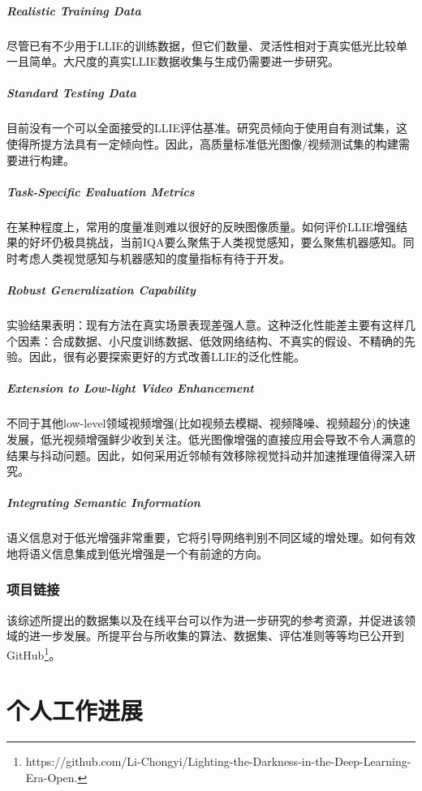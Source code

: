 \documentclass[letterpaper,12pt]{article}
\begin{document}
		\subparagraph{Realistic Training Data} \qquad
		
		尽管已有不少用于LLIE的训练数据，但它们数量、灵活性相对于真实低光比较单一且简单。大尺度的真实LLIE数据收集与生成仍需要进一步研究。
		
		\subparagraph{Standard Testing Data} \qquad
		
		目前没有一个可以全面接受的LLIE评估基准。研究员倾向于使用自有测试集，这使得所提方法具有一定倾向性。因此，高质量标准低光图像/视频测试集的构建需要进行构建。
		
		\subparagraph{Task-Specific Evaluation Metrics} \qquad
		
		在某种程度上，常用的度量准则难以很好的反映图像质量。如何评价LLIE增强结果的好坏仍极具挑战，当前IQA要么聚焦于人类视觉感知，要么聚焦机器感知。同时考虑人类视觉感知与机器感知的度量指标有待于开发。
		
		\subparagraph{Robust Generalization Capability} \qquad
		
		实验结果表明：现有方法在真实场景表现差强人意。这种泛化性能差主要有这样几个因素：合成数据、小尺度训练数据、低效网络结构、不真实的假设、不精确的先验。因此，很有必要探索更好的方式改善LLIE的泛化性能。
		
		\subparagraph{Extension to Low-light Video Enhancement} \qquad
		
		不同于其他low-level领域视频增强(比如视频去模糊、视频降噪、视频超分)的快速发展，低光视频增强鲜少收到关注。低光图像增强的直接应用会导致不令人满意的结果与抖动问题。因此，如何采用近邻帧有效移除视觉抖动并加速推理值得深入研究。
		
		\subparagraph{Integrating Semantic Information} \qquad
		
		语义信息对于低光增强非常重要，它将引导网络判别不同区域的增处理。如何有效地将语义信息集成到低光增强是一个有前途的方向。
	
	
	\subsubsection{项目链接}
	
	该综述所提出的数据集以及在线平台可以作为进一步研究的参考资源，并促进该领域的进一步发展。所提平台与所收集的算法、数据集、评估准则等等均已公开到GitHub\footnote{https://github.com/Li-Chongyi/Lighting-the-Darkness-in-the-Deep-Learning-Era-Open.
	}。
			
	\section{个人工作进展}
					
\end{document}
